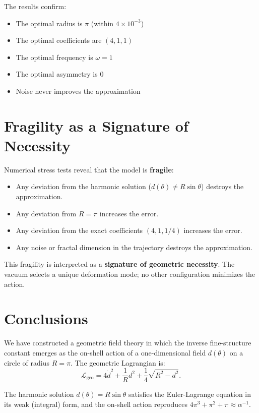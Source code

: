 \documentclass[12pt]{article}
\begin{document}
The results confirm:
\begin{itemize}
    \item The optimal radius is $\pi$ (within $4\times10^{-3}$)
    \item The optimal coefficients are $(4, 1, 1)$
    \item The optimal frequency is $\omega = 1$
    \item The optimal asymmetry is $0$
    \item Noise never improves the approximation
\end{itemize}

\section{Fragility as a Signature of Necessity}

Numerical stress tests reveal that the model is \textbf{fragile}:

\begin{itemize}
    \item Any deviation from the harmonic solution ($d(\theta) \neq R\sin\theta$) destroys the approximation.
    \item Any deviation from $R = \pi$ increases the error.
    \item Any deviation from the exact coefficients $(4, 1, 1/4)$ increases the error.
    \item Any noise or fractal dimension in the trajectory destroys the approximation.
\end{itemize}

This fragility is interpreted as a \textbf{signature of geometric necessity}. The vacuum selects a unique deformation mode; no other configuration minimizes the action.

\section{Conclusions}

We have constructed a geometric field theory in which the inverse fine-structure constant emerges as the on-shell action of a one-dimensional field $d(\theta)$ on a circle of radius $R = \pi$. The geometric Lagrangian is:
\[
\mathcal{L}_{\text{geo}} = 4\dot{d}^2 + \frac{1}{R}d^2 + \frac{1}{4}\sqrt{R^2-d^2}.
\]

The harmonic solution $d(\theta) = R\sin\theta$ satisfies the Euler-Lagrange equation in its weak (integral) form, and the on-shell action reproduces $4\pi^3+\pi^2+\pi \approx \alpha^{-1}$.
\end{document}
